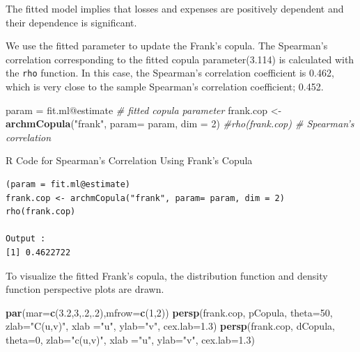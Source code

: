 \documentclass[]{book}
\newenvironment{Shaded}{\begin{snugshade}}{\end{snugshade}}
\newcommand{\KeywordTok}[1]{\textcolor[rgb]{0.13,0.29,0.53}{\textbf{{#1}}}}
\newcommand{\DataTypeTok}[1]{\textcolor[rgb]{0.13,0.29,0.53}{{#1}}}
\newcommand{\DecValTok}[1]{\textcolor[rgb]{0.00,0.00,0.81}{{#1}}}
\newcommand{\FloatTok}[1]{\textcolor[rgb]{0.00,0.00,0.81}{{#1}}}
\newcommand{\StringTok}[1]{\textcolor[rgb]{0.31,0.60,0.02}{{#1}}}
\newcommand{\CommentTok}[1]{\textcolor[rgb]{0.56,0.35,0.01}{\textit{{#1}}}}
\newcommand{\NormalTok}[1]{{#1}}
\theoremstyle{definition}
\theoremstyle{definition}
\theoremstyle{definition}
\theoremstyle{remark}
\begin{document}
The fitted model implies that losses and expenses are positively
dependent and their dependence is significant.

We use the fitted parameter to update the Frank's copula. The Spearman's
correlation corresponding to the fitted copula parameter(3.114) is
calculated with the \texttt{rho} function. In this case, the Spearman's
correlation coefficient is 0.462, which is very close to the sample
Spearman's correlation coefficient; 0.452.

\begin{Shaded}
\begin{Highlighting}[]
\NormalTok{param =}\StringTok{ }\NormalTok{fit.ml@estimate }\CommentTok{# fitted copula parameter}
\NormalTok{frank.cop <-}\StringTok{ }\KeywordTok{archmCopula}\NormalTok{(}\StringTok{"frank"}\NormalTok{, }\DataTypeTok{param=} \NormalTok{param, }\DataTypeTok{dim =} \DecValTok{2}\NormalTok{)}
\CommentTok{#rho(frank.cop) # Spearman's correlation}
\end{Highlighting}
\end{Shaded}

R Code for Spearman's Correlation Using Frank's Copula

\hypertarget{display.fittedCop.2}{}
\begin{verbatim}
(param = fit.ml@estimate)
frank.cop <- archmCopula("frank", param= param, dim = 2)
rho(frank.cop) 

Output : 
[1] 0.4622722
\end{verbatim}

To visualize the fitted Frank's copula, the distribution function and
density function perspective plots are drawn.

\begin{Shaded}
\begin{Highlighting}[]
\KeywordTok{par}\NormalTok{(}\DataTypeTok{mar=}\KeywordTok{c}\NormalTok{(}\FloatTok{3.2}\NormalTok{,}\DecValTok{3}\NormalTok{,.}\DecValTok{2}\NormalTok{,.}\DecValTok{2}\NormalTok{),}\DataTypeTok{mfrow=}\KeywordTok{c}\NormalTok{(}\DecValTok{1}\NormalTok{,}\DecValTok{2}\NormalTok{))}
\KeywordTok{persp}\NormalTok{(frank.cop, pCopula, }\DataTypeTok{theta=}\DecValTok{50}\NormalTok{, }\DataTypeTok{zlab=}\StringTok{"C(u,v)"}\NormalTok{,}
        \DataTypeTok{xlab =}\StringTok{"u"}\NormalTok{, }\DataTypeTok{ylab=}\StringTok{"v"}\NormalTok{, }\DataTypeTok{cex.lab=}\FloatTok{1.3}\NormalTok{)}
\KeywordTok{persp}\NormalTok{(frank.cop, dCopula, }\DataTypeTok{theta=}\DecValTok{0}\NormalTok{, }\DataTypeTok{zlab=}\StringTok{"c(u,v)"}\NormalTok{,}
        \DataTypeTok{xlab =}\StringTok{"u"}\NormalTok{, }\DataTypeTok{ylab=}\StringTok{"v"}\NormalTok{, }\DataTypeTok{cex.lab=}\FloatTok{1.3}\NormalTok{)}
\end{Highlighting}
\end{Shaded}
\end{document}
